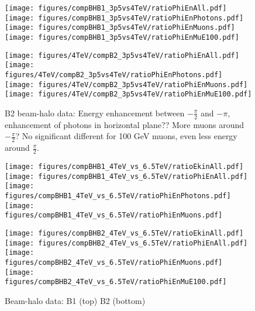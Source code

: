 \begin{figure}
\begin{center}
  \texttt{[image: figures/compBHB1\_3p5vs4TeV/ratioPhiEnAll.pdf]}
  \texttt{[image: figures/compBHB1\_3p5vs4TeV/ratioPhiEnPhotons.pdf]}
  \texttt{[image: figures/compBHB1\_3p5vs4TeV/ratioPhiEnMuons.pdf]}
  \texttt{[image: figures/compBHB1\_3p5vs4TeV/ratioPhiEnMuE100.pdf]}

  \texttt{[image: figures/4TeV/compB2\_3p5vs4TeV/ratioPhiEnAll.pdf]}
  \texttt{[image: figures/4TeV/compB2\_3p5vs4TeV/ratioPhiEnPhotons.pdf]}
  \texttt{[image: figures/4TeV/compB2\_3p5vs4TeV/ratioPhiEnMuons.pdf]}
  \texttt{[image: figures/4TeV/compB2\_3p5vs4TeV/ratioPhiEnMuE100.pdf]}
\end{center}
\vspace{-0.6cm}
 \caption{B2 beam-halo data: Energy enhancement between $-\frac{\pi}{2}$ and $-\pi$, enhancement of photons in horizontal plane?? More muons around $-\frac{\pi}{2}$? No significant different for 100 GeV muons, even less energy around $\frac{\pi}{2}$.
  \label{xingCompBH}}
\end{figure}

\begin{figure}
\begin{center}
  \texttt{[image: figures/compBHB1\_4TeV\_vs\_6.5TeV/ratioEkinAll.pdf]}
  \texttt{[image: figures/compBHB1\_4TeV\_vs\_6.5TeV/ratioPhiEnAll.pdf]}
  \texttt{[image: figures/compBHB1\_4TeV\_vs\_6.5TeV/ratioPhiEnPhotons.pdf]}
  \texttt{[image: figures/compBHB1\_4TeV\_vs\_6.5TeV/ratioPhiEnMuons.pdf]}

  \texttt{[image: figures/compBHB2\_4TeV\_vs\_6.5TeV/ratioEkinAll.pdf]}
  \texttt{[image: figures/compBHB2\_4TeV\_vs\_6.5TeV/ratioPhiEnAll.pdf]}
  \texttt{[image: figures/compBHB2\_4TeV\_vs\_6.5TeV/ratioPhiEnMuons.pdf]}
  \texttt{[image: figures/compBHB2\_4TeV\_vs\_6.5TeV/ratioPhiEnMuE100.pdf]}
\end{center}
\vspace{-0.6cm}
 \caption{Beam-halo data: B1 (top) B2 (bottom)
  \label{valXingBH}}
\end{figure}

